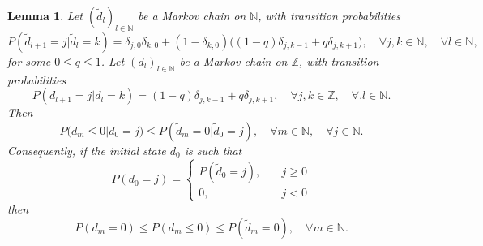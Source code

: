 \documentclass[a4paper,aps,floatfix]{revtex4}
\newtheorem{lemma}[theorem]{Lemma}
\begin{document}
\begin{lemma}
\label{TransitionFromdToTilded}
Let $(\tilde{d}_l)_{l\in\mathbb{N}}$ be a Markov chain on $\mathbb{N}$, with transition probabilities
\begin{equation}
\label{dbangnan}
P(\tilde{d}_{l+1} = j|\tilde{d}_{l} = k) = \delta_{j,0}\delta_{k,0} + (1-\delta_{k,0})\big((1-q)\delta_{j,k-1} +q\delta_{j,k+1}\big),\quad \forall j,k\in\mathbb{N},\quad \forall l\in\mathbb{N},
\end{equation}
for some $0\leq q\leq 1$. 
Let $(d_l)_{l\in\mathbb{N}}$ be a Markov chain on $\mathbb{Z}$, with transition probabilities
\begin{equation}
\label{gfndnnezm}
P(d_{l+1} = j|d_{l} = k) = (1-q)\delta_{j,k-1} + q\delta_{j,k+1},\quad \forall j,k\in\mathbb{Z},\quad \forall. l\in\mathbb{N}.
\end{equation}
Then
\begin{equation}
\label{adfnrtnrtnjwrtj}
P\big(d_m\leq 0|d_0 = j\big) \leq P(\tilde{d}_m = 0|\tilde{d}_0 = j),\quad \forall m\in\mathbb{N},\quad \forall j\in \mathbb{N}.
\end{equation}
Consequently, if the initial state $d_0$ is such that 
\begin{equation}
\label{shtmtsmtemtz}
P(d_0 = j) = \left\{\begin{matrix}
P(\tilde{d}_0 = j), & \quad j \geq 0\\
0 , & \quad  j <0
\end{matrix}\right.
\end{equation}
then
\begin{equation}
\label{sfgndmdhmhm}
P(d_m = 0) \leq P(d_m\leq 0) \leq P(\tilde{d}_m = 0),\quad \forall m\in\mathbb{N}.
\end{equation}
\end{lemma}
\end{document}
